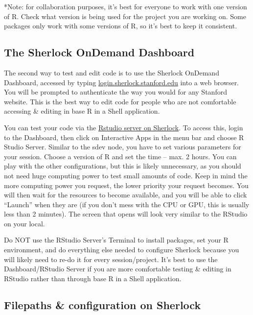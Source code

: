 \documentclass[
]{book}
\begin{document}
*Note: for collaboration purposes, it's best for everyone to work with one version of R. Check what version is being used for the project you are working on. Some packages only work with some versions of R, so it's best to keep it consistent.

\subsection{The Sherlock OnDemand Dashboard}\label{the-sherlock-ondemand-dashboard}

The second way to test and edit code is to use the Sherlock OnDemand Dashboard, accessed by typing \url{login.sherlock.stanford.edu} into a web browser. You will be prompted to authenticate the way you would for any Stanford website. This is the best way to edit code for people who are not comfortable accessing \& editing in base R in a Shell application.

You can test your code via the \href{https://www.sherlock.stanford.edu/docs/user-guide/ondemand/\#rstudio}{Rstudio server on Sherlock}. To access this, login to the Dashboard, then click on Interactive Apps in the menu bar and choose R Studio Server. Similar to the sdev node, you have to set various parameters for your session. Choose a version of R and set the time -- max. 2 hours. You can play with the other configurations, but this is likely unnecessary, as you should not need huge computing power to test small amounts of code. Keep in mind the more computing power you request, the lower priority your request becomes. You will then wait for the resources to become available, and you will be able to click ``Launch'' when they are (if you don't mess with the CPU or GPU, this is usually less than 2 minutes). The screen that opens will look very similar to the RStudio on your local.

Do NOT use the RStudio Server's Terminal to install packages, set your R environment, and do everything else needed to configure Sherlock because you will likely need to re-do it for every session/project. It's best to use the Dashboard/RStudio Server if you are more comfortable testing \& editing in RStudio rather than through base R in a Shell application.

\subsection{Filepaths \& configuration on Sherlock}\label{filepaths-configuration-on-sherlock}
\end{document}
